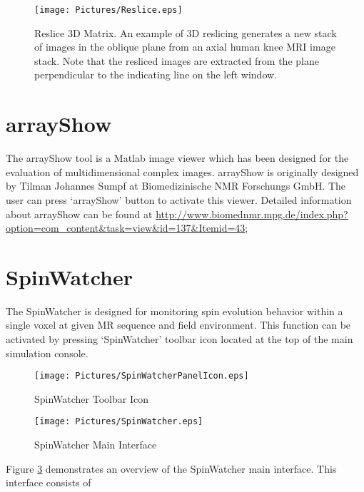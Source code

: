 \documentclass{book}%
\begin{document}
\begin{enumerate}
		\begin{figure}[htbp]
		\centering
			\texttt{[image: Pictures/Reslice.eps]}
		\caption{Reslice 3D Matrix. An example of 3D reslicing generates a new stack of images in the oblique plane from an axial human knee MRI image stack. Note that the resliced images are extracted from the plane perpendicular to the indicating line on the left window.}
		\label{fig:Reslice}
	\end{figure}	
	
\end{enumerate}



\section{arrayShow}

The arrayShow tool is a Matlab image viewer which has been designed for the evaluation of multidimensional complex images. arrayShow is originally designed by Tilman Johannes Sumpf at Biomedizinische NMR Forschungs GmbH. The user can press `arrayShow' button to activate this viewer. Detailed information about arrayShow can be found at \url{http://www.biomednmr.mpg.de/index.php?option=com_content&task=view&id=137&Itemid=43}; 

\section{SpinWatcher}

The SpinWatcher is designed for monitoring spin evolution behavior within a single voxel at given MR sequence and field environment. This function can be activated by pressing `SpinWatcher' toolbar icon located at the top of the main simulation console.

\begin{figure}[htbp]
	\centering
		\texttt{[image: Pictures/SpinWatcherPanelIcon.eps]}
	\caption{SpinWatcher Toolbar Icon}
	\label{fig:SpinWatcherPanelIcon}
\end{figure}


\begin{figure}[htbp]
	\centering
		\texttt{[image: Pictures/SpinWatcher.eps]}
	\caption{SpinWatcher Main Interface}
	\label{fig:SpinWatcher}
\end{figure}

Figure \ref{fig:SpinWatcher} demonstrates an overview of the SpinWatcher main interface. This interface consists of 
\end{document}

